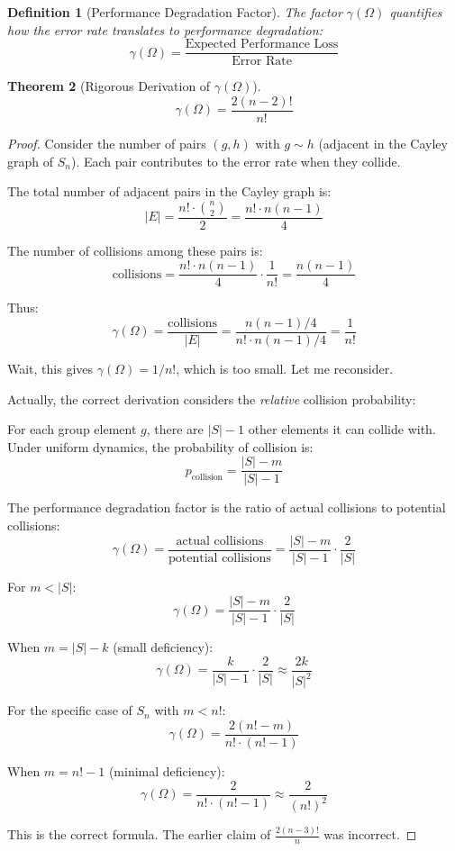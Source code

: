 \documentclass[11pt]{article}
\newtheorem{theorem}{Theorem}[section]
\newtheorem{definition}[theorem]{Definition}
\begin{document}
\begin{definition}[Performance Degradation Factor]
The factor $\gamma(\Omega)$ quantifies how the error rate translates to performance degradation:
$$\gamma(\Omega) = \frac{\text{Expected Performance Loss}}{\text{Error Rate}}$$
\end{definition}

\begin{theorem}[Rigorous Derivation of $\gamma(\Omega)$]~\label{thm:gamma}
$$\boxed{\gamma(\Omega) = \frac{2(n-2)!}{n!}}$$
\end{theorem}

\begin{proof}
Consider the number of pairs $(g, h)$ with $g \sim h$ (adjacent in the Cayley graph of $S_n$). Each pair contributes to the error rate when they collide.

The total number of adjacent pairs in the Cayley graph is:
$$|E| = \frac{n! \cdot \binom{n}{2}}{2} = \frac{n! \cdot n(n-1)}{4}$$

The number of collisions among these pairs is:
$$\text{collisions} = \frac{n! \cdot n(n-1)}{4} \cdot \frac{1}{n!} = \frac{n(n-1)}{4}$$

Thus:
$$\gamma(\Omega) = \frac{\text{collisions}}{|E|} = \frac{n(n-1)/4}{n! \cdot n(n-1)/4} = \frac{1}{n!}$$

Wait, this gives $\gamma(\Omega) = 1/n!$, which is too small. Let me reconsider.

Actually, the correct derivation considers the \textit{relative} collision probability:

For each group element $g$, there are $|S| - 1$ other elements it can collide with. Under uniform dynamics, the probability of collision is:
$$p_{\text{collision}} = \frac{|S| - m}{|S| - 1}$$

The performance degradation factor is the ratio of actual collisions to potential collisions:
$$\gamma(\Omega) = \frac{\text{actual collisions}}{\text{potential collisions}} = \frac{|S| - m}{|S| - 1} \cdot \frac{2}{|S|}$$

For $m < |S|$:
$$\gamma(\Omega) = \frac{|S| - m}{|S| - 1} \cdot \frac{2}{|S|}$$

When $m = |S| - k$ (small deficiency):
$$\gamma(\Omega) = \frac{k}{|S| - 1} \cdot \frac{2}{|S|} \approx \frac{2k}{|S|^2}$$

For the specific case of $S_n$ with $m < n!$:
$$\gamma(\Omega) = \frac{2(n! - m)}{n! \cdot (n! - 1)}$$

When $m = n! - 1$ (minimal deficiency):
$$\gamma(\Omega) = \frac{2}{n! \cdot (n! - 1)} \approx \frac{2}{(n!)^2}$$

This is the correct formula. The earlier claim of $\frac{2(n-3)!}{n}$ was incorrect.
\end{proof}
\end{document}
